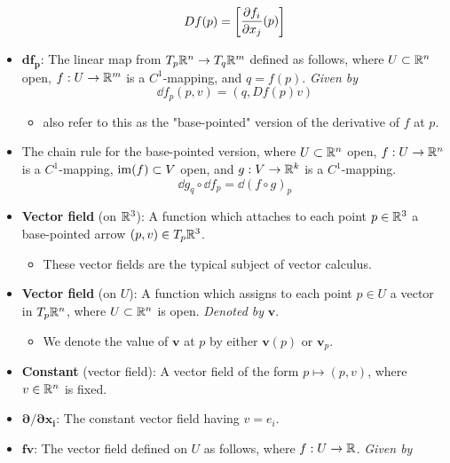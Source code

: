 \documentclass[../notes.tex]{subfiles}
\begin{document}
\begin{itemize}
    \begin{equation*}
        Df(p) =
        \begin{bmatrix}
            \displaystyle{\pdv{f_i}{x_j}}(p)
        \end{bmatrix}
    \end{equation*}
    \item $\bm{\mathbf{d}f_p}$: The linear map from $T_p\mathbb{R}^n\to T_q\mathbb{R}^m$ defined as follows, where $U\subset\mathbb{R}^n$ open, $f:U\to\mathbb{R}^m$ is a $C^1$-mapping, and $q=f(p)$. \emph{Given by}
    \begin{equation*}
        \dd f_p(p,v) = (q,Df(p)v)
    \end{equation*}
    \begin{itemize}
        \item \textcite{bib:DifferentialForms} also refer to this as the "base-pointed" version of the derivative of $f$ at $p$.
    \end{itemize}
    \item The chain rule for the base-pointed version, where $U\subset\mathbb{R}^n$ open, $f:U\to\mathbb{R}^n$ is a $C^1$-mapping, $\operatorname{im}(f)\subset V$ open, and $g:V\to\mathbb{R}^k$ is a $C^1$-mapping.
    \begin{equation*}
        \dd g_q\circ\dd f_p = \dd(f\circ g)_p
    \end{equation*}
    \item \textbf{Vector field} (on $\mathbb{R}^3$): A function which attaches to each point $p\in\mathbb{R}^3$ a base-pointed arrow $(p,v)\in T_p\mathbb{R}^3$.
    \begin{itemize}
        \item These vector fields are the typical subject of vector calculus.
    \end{itemize}
    \item \textbf{Vector field} (on $U$): A function which assigns to each point $p\in U$ a vector in $T_p\mathbb{R}^n$, where $U\subset\mathbb{R}^n$ is open. \emph{Denoted by} $\bm{v}$.
    \begin{itemize}
        \item We denote the value of $\bm{v}$ at $p$ by either $\bm{v}(p)$ or $\bm{v}_p$.
    \end{itemize}
    \item \textbf{Constant} (vector field): A vector field of the form $p\mapsto(p,v)$, where $v\in\mathbb{R}^n$ is fixed.
    \item $\bm{\partial/\partial x_i}$: The constant vector field having $v=e_i$.
    \item $\bm{f\pmb{v}}$: The vector field defined on $U$ as follows, where $f:U\to\mathbb{R}$. \emph{Given by}

\end{itemize}
\end{document}
